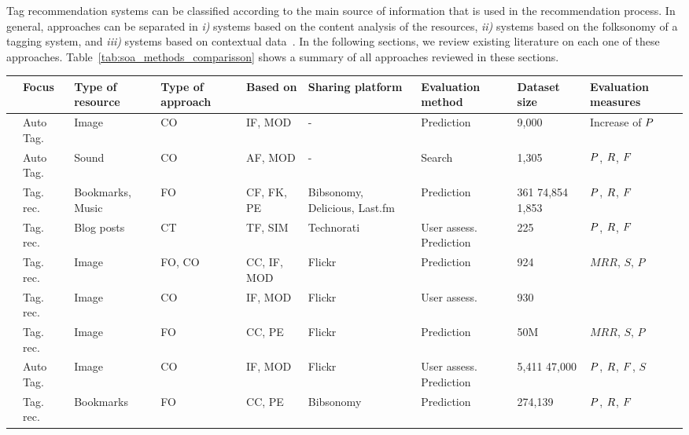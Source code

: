 Tag recommendation systems can be classified according to the main source of information that is used in the recommendation process.
In general, approaches can be separated in \emph{i)} systems based on the content analysis of the resources, \emph{ii)} systems based on the folksonomy of a tagging system, and \emph{iii)} systems based on contextual data~\citep{Wang2012}. 
In the following sections, we review existing literature on each one of these approaches.
Table~\ref{tab:soa_methods_comparisson} shows a summary of all approaches reviewed in these sections.


\begin{table}
\begin{threeparttable}
\centering
{} %
\tiny
\begin{tabular}{@{}p{3.0cm}p{1.35cm}P{2.3cm}P{1.6cm}P{2.3cm}p{1.6cm}p{1.45cm}T{1.0cm}p{2.5cm}@{}}
\toprule
& \textbf{Focus} & \textbf{Type of resource} & \textbf{Type of approach} & \textbf{Based on} & \textbf{Sharing platform} & \textbf{Evaluation method} & \textbf{Dataset size} & \textbf{Evaluation} \hspace{0.5cm} \textbf{measures} \\
\midrule
\cite{Barnard2003} & Auto Tag. & Image & CO & IF, MOD & - & Prediction & 9,000 & Increase of $P$ \\
\cite{barrington2007} & Auto Tag. & Sound & CO & AF, MOD & - & Search & 1,305 & $P$, $R$, $F$ \\
\cite{jaske2007} & Tag. rec. & Bookmarks, Music & FO & CF, FK, PE & Bibsonomy, Delicious, Last.fm & Prediction & 361 74,854 1,853 & $P$, $R$, $F$ \\
\cite{Sood2007} & Tag. rec. & Blog posts & CT & TF, SIM & Technorati & User assess. Prediction & 225 & $P$, $R$, $F$ \\
\cite{Anderson2008} & Tag. rec. & Image & FO, CO & CC, IF, MOD & Flickr & Prediction & 924 & $MRR$, $S$, $P$ \\
\cite{Chen2008a} & Tag. rec. & Image & CO & IF, MOD & Flickr & User assess. & 930 &  \\
\cite{Garg2008} & Tag. rec. & Image & FO & CC, PE & Flickr & Prediction & 50M & $MRR$, $S$, $P$ \\
\cite{Li2006} & Auto Tag. & Image & CO & IF, MOD & Flickr & User assess. Prediction & 5,411 47,000 & $P$, $R$, $F$, $S$ \\
\cite{Lipczak2008} & Tag. rec. & Bookmarks & FO & CC, PE & Bibsonomy & Prediction & 274,139 & $P$, $R$, $F$ \\

\end{tabular}
\end{threeparttable}
\end{table}
